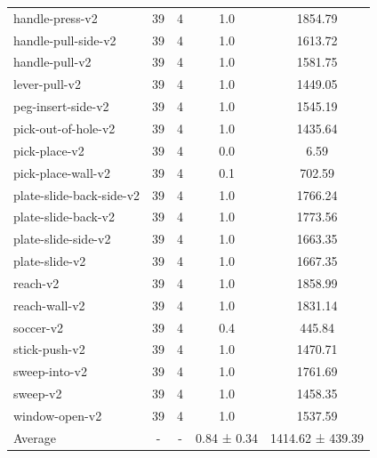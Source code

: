 \begin{table}[]
\begin{tabular}{l c c c c}
                 handle-press-v2 &  39 & 4 &  1.0 &    1854.79  \\
             handle-pull-side-v2 &  39 & 4 &  1.0 &    1613.72  \\
                  handle-pull-v2 &  39 & 4 &  1.0 &    1581.75  \\
                   lever-pull-v2 &  39 & 4 &  1.0 &    1449.05  \\
              peg-insert-side-v2 &  39 & 4 &  1.0 &    1545.19  \\
             pick-out-of-hole-v2 &  39 & 4 &  1.0 &    1435.64  \\
                   pick-place-v2 &  39 & 4 &  0.0 &       6.59  \\
              pick-place-wall-v2 &  39 & 4 &  0.1 &     702.59  \\
        plate-slide-back-side-v2 &  39 & 4 &  1.0 &    1766.24  \\
             plate-slide-back-v2 &  39 & 4 &  1.0 &    1773.56  \\
             plate-slide-side-v2 &  39 & 4 &  1.0 &    1663.35  \\
                  plate-slide-v2 &  39 & 4 &  1.0 &    1667.35  \\
                        reach-v2 &  39 & 4 &  1.0 &    1858.99  \\
                   reach-wall-v2 &  39 & 4 &  1.0 &    1831.14  \\
                       soccer-v2 &  39 & 4 &  0.4 &     445.84  \\
                   stick-push-v2 &  39 & 4 &  1.0 &    1470.71  \\
                   sweep-into-v2 &  39 & 4 &  1.0 &    1761.69  \\
                        sweep-v2 &  39 & 4 &  1.0 &    1458.35  \\
                  window-open-v2 &  39 & 4 &  1.0 &    1537.59  \\
                  \midrule
             Average &  - & - & 0.84 ± 0.34 & 1414.62 ± 439.39 \\
    \bottomrule
    \end{tabular}
    \label{tab:mt40}
\end{table}

